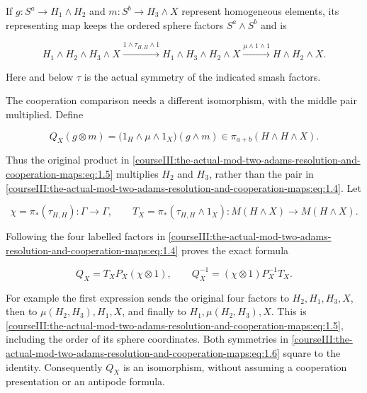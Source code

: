 If \(g:S^a\to H_1\wedge H_2\) and \(m:S^b\to H_3\wedge X\) represent homogeneous elements, its representing map keeps the ordered sphere factors \(S^a\wedge S^b\) and is

\begin{equation}
H_1\wedge H_2\wedge H_3\wedge X
 \xrightarrow{1\wedge\tau_{H,H}\wedge1}
 H_1\wedge H_3\wedge H_2\wedge X
 \xrightarrow{\mu\wedge1\wedge1}
 H\wedge H_2\wedge X.
 \label{courseIII:the-actual-mod-two-adams-resolution-and-cooperation-maps:eq:1.4}
\end{equation}

Here and below \(\tau\) is the actual symmetry of the indicated smash factors.

The cooperation comparison needs a different isomorphism, with the middle pair multiplied. Define

\begin{equation}
Q_X(g\otimes m)
 =\bigl(1_H\wedge\mu\wedge1_X\bigr)(g\wedge m)
 \in\pi_{a+b}(H\wedge H\wedge X).
 \label{courseIII:the-actual-mod-two-adams-resolution-and-cooperation-maps:eq:1.5}
\end{equation}

Thus the original product in \eqref{courseIII:the-actual-mod-two-adams-resolution-and-cooperation-maps:eq:1.5} multiplies \(H_2\) and \(H_3\), rather than the pair in \eqref{courseIII:the-actual-mod-two-adams-resolution-and-cooperation-maps:eq:1.4}. Let

\begin{equation}
\chi=\pi_*(\tau_{H,H}):\Gamma\to\Gamma,
 \qquad T_X=\pi_*(\tau_{H,H}\wedge1_X):M(H\wedge X)\to M(H\wedge X).
 \label{courseIII:the-actual-mod-two-adams-resolution-and-cooperation-maps:eq:1.6}
\end{equation}

Following the four labelled factors in \eqref{courseIII:the-actual-mod-two-adams-resolution-and-cooperation-maps:eq:1.4} proves the exact formula

\begin{equation}
Q_X=T_XP_X(\chi\otimes1),\qquad
 Q_X^{-1}=(\chi\otimes1)P_X^{-1}T_X.
 \label{courseIII:the-actual-mod-two-adams-resolution-and-cooperation-maps:eq:1.7}
\end{equation}

For example the first expression sends the original four factors to
\(H_2,H_1,H_3,X\), then to \(\mu(H_2,H_3),H_1,X\), and finally to \(H_1,\mu(H_2,H_3),X\). This is \eqref{courseIII:the-actual-mod-two-adams-resolution-and-cooperation-maps:eq:1.5}, including the order of its sphere coordinates. Both symmetries in \eqref{courseIII:the-actual-mod-two-adams-resolution-and-cooperation-maps:eq:1.6} square to the identity. Consequently \(Q_X\) is an isomorphism, without assuming a cooperation presentation or an antipode formula.

